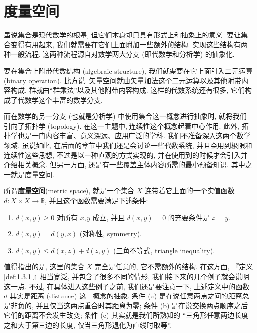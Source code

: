 \documentclass[lang=cn,zihao=-4,twoside,fontset=none]{textbook}
\makeatletter
\newcommand{\defref}[1]{\hyperref[#1]{『定义\textnormal{\ref*{#1}}』}}
\newcommand{\addterm}[2]{\textbf{#1}{(#2)}\index[nidx]{#1@\textbf{#1}(#2)}}
\makeatother
\begin{document}
\newpage
\section{度量空间}

虽说集合是现代数学的根基, 但它们本身却只具有形式上和抽象上的意义. 要让集合变得有用起来, 我们就需要在它们上面附加一些额外的结构. 实现这些结构有两种一般流程. 这两种流程源自对数学两大分支 (即代数学和分析学) 的抽象化. 

要在集合上附带代数结构 (algebraic structure), 我们就需要在它上面引入二元运算 (binary operation). 比方说, 矢量空间就由矢量加法这个二元运算以及其他附带内容构成. 群就由“群乘法”以及其他附带内容构成. 这样的代数系统还有很多, 它们构成了代数学这个丰富的数学分支. 

而在数学的另一分支 (也就是分析学) 中使用集合这一概念进行抽象时, 就将我们引向了拓扑学 (topology). 在这一主题中, 连续性这个概念起着中心作用. 此外, 拓扑学也是一门内容丰富、意义深远、应用广泛的学科. 我们不准备深入这两个数学领域. 虽说如此, 在后面的章节中我们还是会讨论一些代数系统, 并且会用到极限和连续性这些思想, 不过是以一种直观的方式实现的, 并在使用到的时候才会引入并介绍相关概念. 但另一方面, 还是有一些覆盖主体内容所需的最小预备知识. 其中之一就是度量空间.

\begin{defi}[度量空间]\label{def:1.3.1}
    所谓\addterm{度量空间}{metric space}, 就是一个集合 $X$ 连带着它上面的一个实值函数 $d:X\times X\to\mathbb R$, 并且这个函数需要满足下述条件:
    \begin{enumerate}[label=\textnormal{(\alph*)}]
        \item $d(x,y)\geq 0$ 对所有 $x,y$ 成立, 并且 $d(x,y)=0$ 的充要条件是 $x=y$.
        \item $d(x,y)=d(y,x)$ (对称性, symmetry).
        \item $d(x,y)\leq d(x,z)+d(z,y)$ (三角不等式, triangle inequality).
    \end{enumerate}
\end{defi}


值得指出的是, 这里的集合 $X$ 完全是任意的, 它不需额外的结构. 在这方面, \defref{def:1.3.1}相当宽泛, 并包含了很多不同的情形, 我们接下来的几个例子就会说明这一点. 不过, 在具体进入这些例子之前, 我们还是要注意一下, 上述定义中的函数 $d$ 其实是距离 (distance) 这一概念的抽象: 条件 (a) 是在说任意两点之间的距离总是非负的, 并且仅当这两点重合时其距离为零; 条件 (b) 是在说交换两点顺序之后它们的距离不会发生改变; 条件 (c) 其实就是我们所熟知的 “三角形任意两边长度之和大于第三边的长度, 仅当三角形退化为直线时取等”.  
\end{document}
